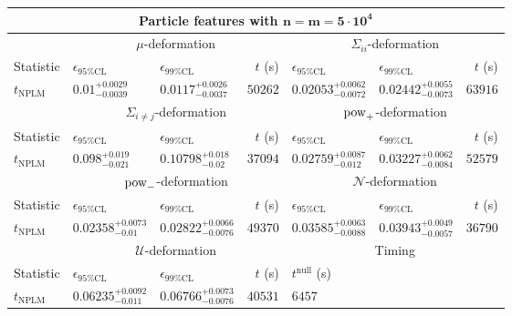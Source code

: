 \begin{tabular}{l|llr|llr}
	\toprule
	\multicolumn{7}{c}{{\bf Particle features with $\mathbf{n=m=5\cdot 10^{4}}$}} \\
	\toprule
	\multicolumn{1}{c}{} & \multicolumn{3}{c}{$\mu$-deformation} & \multicolumn{3}{c}{$\Sigma_{ii}$-deformation} \\
	Statistic & $\epsilon_{95\%\mathrm{CL}}$ & $\epsilon_{99\%\mathrm{CL}}$ & $t$ (s) & $\epsilon_{95\%\mathrm{CL}}$ & $\epsilon_{99\%\mathrm{CL}}$ & $t$ (s) \\
	\midrule
	$t_{\mathrm{NPLM}}$ & $0.01_{-0.0039}^{+0.0029}$ & $0.0117_{-0.0037}^{+0.0026}$ & $50262$ & $0.02053_{-0.0072}^{+0.0062}$ & $0.02442_{-0.0073}^{+0.0055}$ & $63916$ \\
	\toprule
	\multicolumn{1}{c}{} & \multicolumn{3}{c}{$\Sigma_{i\neq j}$-deformation} & \multicolumn{3}{c}{$\rm{pow}_{+}$-deformation} \\
	Statistic & $\epsilon_{95\%\mathrm{CL}}$ & $\epsilon_{99\%\mathrm{CL}}$ & $t$ (s) & $\epsilon_{95\%\mathrm{CL}}$ & $\epsilon_{99\%\mathrm{CL}}$ & $t$ (s) \\
	\midrule
	$t_{\mathrm{NPLM}}$ & $0.098_{-0.021}^{+0.019}$ & $0.10798_{-0.02}^{+0.018}$ & $37094$ & $0.02759_{-0.012}^{+0.0087}$ & $0.03227_{-0.0084}^{+0.0062}$ & $52579$ \\
	\toprule
	\multicolumn{1}{c}{} & \multicolumn{3}{c}{$\rm{pow}_{-}$-deformation} & \multicolumn{3}{c}{$\mathcal{N}$-deformation} \\
	Statistic & $\epsilon_{95\%\mathrm{CL}}$ & $\epsilon_{99\%\mathrm{CL}}$ & $t$ (s) & $\epsilon_{95\%\mathrm{CL}}$ & $\epsilon_{99\%\mathrm{CL}}$ & $t$ (s) \\
	\midrule
	$t_{\mathrm{NPLM}}$ & $0.02358_{-0.01}^{+0.0073}$ & $0.02822_{-0.0076}^{+0.0066}$ & $49370$ & $0.03585_{-0.0088}^{+0.0063}$ & $0.03943_{-0.0057}^{+0.0049}$ & $36790$ \\
	\toprule
	\multicolumn{1}{c}{} & \multicolumn{3}{c}{$\mathcal{U}$-deformation} & \multicolumn{3}{c}{Timing} \\
	Statistic & $\epsilon_{95\%\mathrm{CL}}$ & $\epsilon_{99\%\mathrm{CL}}$ & $t$ (s) & $t^{\mathrm{null}}$ (s) \\
	\midrule
	$t_{\mathrm{NPLM}}$ & $0.06235_{-0.011}^{+0.0092}$ & $0.06766_{-0.0076}^{+0.0073}$ & $40531$ & $6457$ \\
	\bottomrule
\end{tabular}